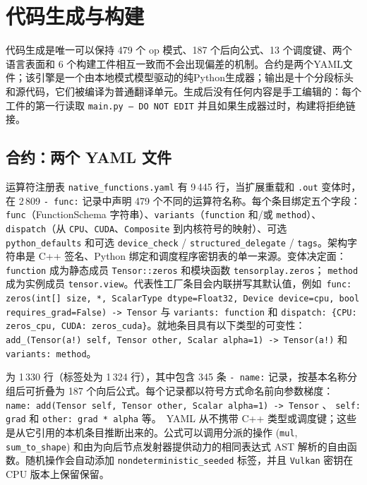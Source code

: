 \section{代码生成与构建}
\label{sec:codegen}

代码生成是唯一可以保持 479 个 \ac{op} 模式、187 个后向公式、13 个调度键、两个语言表面和 6 个构建工件相互一致而不会出现偏差的机制。合约是两个YAML文件；该引擎是一个由本地模式模型驱动的纯Python生成器；输出是十个分段标头和源代码，它们被编译为普通翻译单元。生成后没有任何内容是手工编辑的：每个工件的第一行读取 \texttt{main.py -- DO NOT EDIT} 并且如果生成器过时，构建将拒绝链接。

\subsection{合约：两个 YAML 文件}

运算符注册表 \texttt{native\_functions.yaml} 有 9\,445 行，当扩展重载和 \texttt{.out} 变体时，在 2\,809 \texttt{- func:} 记录中声明 479 个不同的运算符名称。每个条目绑定五个字段：\texttt{func}（FunctionSchema 字符串）、\texttt{variants}（\texttt{function} 和/或 \texttt{method}）、\texttt{dispatch}（从 \texttt{CPU}、\texttt{CUDA}、\texttt{Composite} 到内核符号的映射）、可选 \texttt{python\_defaults} 和可选 \texttt{device\_check} / \texttt{structured\_delegate} / \texttt{tags}。架构字符串是 C++ 签名、Python 绑定和调度程序密钥表的单一来源。变体决定面：\texttt{function} 成为静态成员 \texttt{Tensor::zeros} 和模块函数 \texttt{tensorplay.zeros}； \texttt{method} 成为实例成员 \texttt{tensor.view}。代表性工厂条目会内联拼写其默认值，例如\ \texttt{func: zeros(int[] size, *, ScalarType dtype=Float32, Device device=cpu, bool requires\_grad=False) -> Tensor} 与 \texttt{variants: function} 和 \texttt{dispatch: \{CPU: zeros\_cpu, CUDA: zeros\_cuda\}}。就地条目具有以下类型的可变性：\texttt{add\_(Tensor(a!) self, Tensor other, Scalar alpha=1) -> Tensor(a!)} 和 \texttt{variants: method}。

为 1\,330 行（标签处为 1\,324 行），其中包含 345 条 \texttt{- name:} 记录，按基本名称分组后可折叠为 187 个向后公式。每个记录都以符号方式命名前向参数梯度： \texttt{name: add(Tensor self, Tensor other, Scalar alpha=1) -> Tensor} 、 \texttt{self: grad} 和 \texttt{other: grad * alpha} 等。\ YAML 从不携带 C++ 类型或调度键；这些是从它引用的本机条目推断出来的。公式可以调用分派的操作 (\texttt{mul}, \texttt{sum\_to\_shape}) 和由为向后节点发射器提供动力的相同表达式 AST 解析的自由函数。随机操作会自动添加 \texttt{nondeterministic\_seeded} 标签，并且 \texttt{Vulkan} 密钥在 CPU 版本上保留保留。

